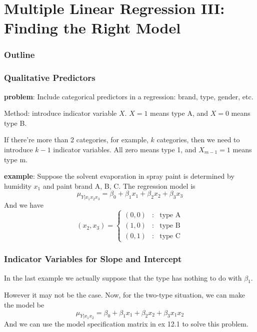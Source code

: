 \documentclass{beamer}
\begin{document}
\section{Multiple Linear Regression III:
Finding the Right Model}
\begin{frame}
    \frametitle{Outline}
    \tableofcontents[currentsection]
\end{frame}

\begin{frame}
    \frametitle{Qualitative Predictors}

    \textbf{problem}: Include categorical predictors in a regression: brand, type,
    gender, etc.\par
    Method: introduce indicator variable $X$. $X=1$ means type A, and $X=0$ means type B.\par
    If there're more than 2 categories, for example, $k$ categories, then we need to introduce $k-1$ indicator variables. All zero means type 1, and $X_{m-1}=1$ means type m.\par
    \vspace{0.3cm}
    \textbf{example}: Suppose the solvent evaporation in spray paint is determined by humidity $x_1$ and paint brand A, B, C. The regression model is 
    \[\mu_{Y|x_1 x_2 x_3}=\beta_0+\beta_1 x_1+\beta_2 x_2+\beta_3 x_3\]
    And we have 
    \begin{equation*}
        (x_2,x_3)=\left\{
        \begin{aligned}
        (0,0) & : & \text{type A} \\
        (1,0) & : & \text{type B} \\
        (0,1) & : & \text{type C}
        \end{aligned}
        \right.
        \end{equation*}

\end{frame}

\begin{frame}
    \frametitle{Indicator Variables for Slope and Intercept}

    In the last example we actually suppose that the type has nothing to do with $\beta_1$. \par
    However it may not be the case. Now, for the two-type situation, we can make the model be
    \[\mu_{Y|x_1 x_2}=\beta_0+\beta_1 x_1+\beta_2 x_2 +\beta_3 x_1 x_2\]
    And we can use the model specification matrix in ex 12.1 to solve this problem.

\end{frame}
\end{document}
